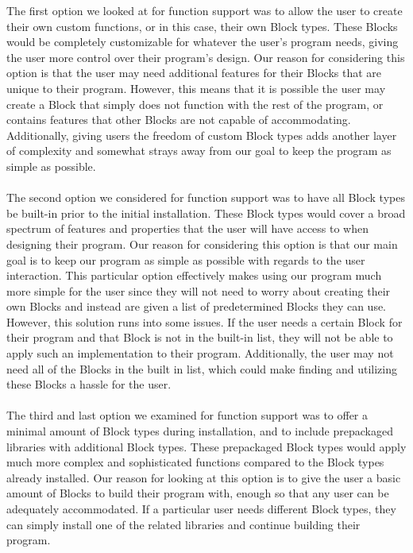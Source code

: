 \documentclass[journal,10pt,onecolumn,compsoc]{IEEEtran} \usepackage[margin=1.0in]{geometry} \usepackage{pdfpages} \usepackage{graphicx}
\begin{document}
\indent The first option we looked at for function support was to allow the user to create their own custom functions, or in this case, their own Block types. 
These Blocks would be completely customizable for whatever the user's program needs, giving the user more control over their program's design. 
Our reason for considering this option is that the user may need additional features for their Blocks that are unique to their program. 
However, this means that it is possible the user may create a Block that simply does not function with the rest of the program, or contains features that other Blocks are not capable of accommodating. 
Additionally, giving users the freedom of custom Block types adds another layer of complexity and somewhat strays away from our goal to keep the program as simple as possible.
\\
\\
\noindent The second option we considered for function support was to have all Block types be built-in prior to the initial installation. 
These Block types would cover a broad spectrum of features and properties that the user will have access to when designing their program. 
Our reason for considering this option is that our main goal is to keep our program as simple as possible with regards to the user interaction. 
This particular option effectively makes using our program much more simple for the user since they will not need to worry about creating their own Blocks and instead are given a list of predetermined Blocks they can use. 
However, this solution runs into some issues. 
If the user needs a certain Block for their program and that Block is not in the built-in list, they will not be able to apply such an implementation to their program. 
Additionally, the user may not need all of the Blocks in the built in list, which could make finding and utilizing these Blocks a hassle for the user.
\\
\\
\noindent The third and last option we examined for function support was to offer a minimal amount of Block types during installation, and to include prepackaged libraries with additional Block types. 
These prepackaged Block types would apply much more complex and sophisticated functions compared to the Block types already installed. 
Our reason for looking at this option is to give the user a basic amount of Blocks to build their program with, enough so that any user can be adequately accommodated. 
If a particular user needs different Block types, they can simply install one of the related libraries and continue building their program. 
\end{document}
